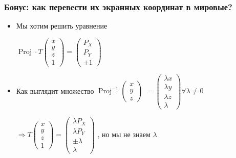 \documentclass{beamer}
\begin{document}
\begin{frame}[fragile]
\frametitle{Бонус: как перевести их экранных координат в мировые?}
\begin{itemize}
\item Мы хотим решить уравнение
\begin{center}
\begin{math}
\operatorname{Proj}\cdot T \begin{pmatrix}x \\ y \\ z \\ 1\end{pmatrix} = \begin{pmatrix}P_X \\ P_Y \\ \pm 1\end{pmatrix}
\end{math}
\end{center}
\pause
\item Как выглядит множество \begin{math}\operatorname{Proj}^{-1} \begin{pmatrix}x \\ y \\ z\end{pmatrix}\end{math} \pause \begin{math}=\begin{pmatrix}\lambda x \\ \lambda y \\ \lambda z \\ \lambda \end{pmatrix} \forall \lambda  \neq 0\end{math}
\pause
\begin{center}
\begin{math}
\Rightarrow T \begin{pmatrix}x \\ y \\ z \\ 1\end{pmatrix} = \begin{pmatrix}\lambda P_X \\ \lambda P_Y \\ \pm \lambda \\ \lambda\end{pmatrix}
\end{math}
, но мы не знаем \begin{math}\lambda\end{math}
\end{center}
\end{itemize}
\end{frame}
\end{document}
